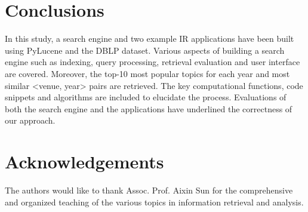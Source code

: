 \documentclass{sig-alternate-05-2015}
\begin{document}
\section{Conclusions} \label{sec:conc}
In this study, a search engine and two example IR applications have been built using PyLucene and the DBLP dataset. Various aspects of building a search engine such as indexing, query processing, retrieval evaluation and user interface are covered. Moreover, the top-10 most popular topics for each year and most similar <venue, year> pairs are retrieved. The key computational functions, code snippets and algorithms are included to elucidate the process. Evaluations of both the search engine and the applications have underlined the correctness of our approach.

\section{Acknowledgements}
The authors would like to thank Assoc. Prof. Aixin Sun for the comprehensive and organized teaching of the various topics in information retrieval and analysis.
%

%
\end{document}
